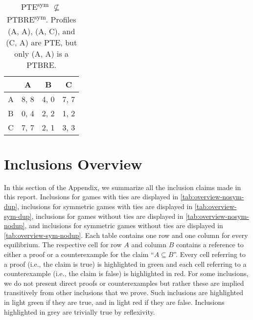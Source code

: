 \begin{table}
	\caption{
		PTE\textsuperscript{sym} $\not\subseteq$ PTBRE\textsuperscript{sym}.
		Profiles (A, A), (A, C), and (C, A) are PTE, but only (A, A) is a PTBRE.
	}
	\label{tab:ties-pte-not-sub-ptbre}
	\centering
	\begin{tabular}{|c|c|c|c|}
		\hline
			& A		& B	   & C	  \\
		\hline
		A 		&\cellcolor{gray!00} 8, 8 &\cellcolor{gray!70} 4, 0 &\cellcolor{gray!00} 7, 7 \\
		\hline
		B		&\cellcolor{gray!70} 0, 4 &\cellcolor{gray!70} 2, 2 &\cellcolor{gray!70} 1, 2 \\
		\hline
		C		&\cellcolor{gray!00} 7, 7 &\cellcolor{gray!70} 2, 1 &\cellcolor{gray!70} 3, 3 \\
		\hline
	\end{tabular}
\end{table}


\section{Inclusions Overview}
\label{sec:inclusions-overview}
In this section of the Appendix, we summarize all the inclusion claims made in this report.
Inclusions for games with ties are displayed in \autoref{tab:overview-nosym-dup}, inclusions for symmetric games with ties are displayed in \autoref{tab:overview-sym-dup}, inclusions for games without ties are displayed in \autoref{tab:overview-nosym-nodup}, and inclusions for symmetric games without ties are displayed in \autoref{tab:overview-sym-nodup}.
Each table contains one row and one column for every equilibrium.
The respective cell for row $A$ and column $B$ contains a reference to either a proof or a counterexample for the claim \enquote{$A \subseteq B$}.
Every cell referring to a proof (i.e., the claim is true) is highlighted in \colorbox{green!30}{green} and each cell referring to a counterexample (i.e., the claim is false) is highlighted in \colorbox{red!30}{red}.
For some inclusions, we do not present direct proofs or counterexamples but rather these are implied transitively from other inclusions that we prove.
Such inclusions are highlighted in \colorbox{green!15}{light green} if they are true, and in \colorbox{red!15}{light red} if they are false.
Inclusions highlighted in \colorbox{gray!30}{grey} are trivially true by reflexivity.

